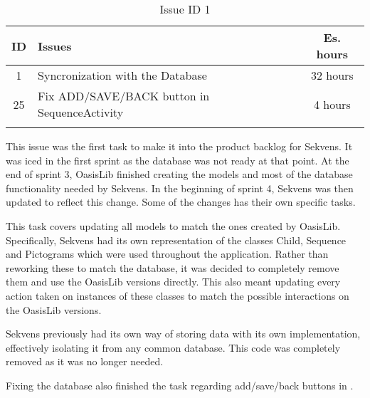 \begin{longtable} { | c | p{12cm} | c | } 
\hline
	ID 	&	Issues	&		 Es. hours \\\hline
	1	&	Syncronization with the Database	&	32 hours	\\\hline
	25	&	Fix ADD/SAVE/BACK button in SequenceActivity	&	4 hours	\\\hline
\caption{Issue ID 1}
\label{tab:spr4_syncwithdatabase}
\end{longtable}

This issue was the first task to make it into the product backlog for Sekvens. It was iced in the first sprint as the database was not ready at that point. At the end of sprint 3, OasisLib finished creating the models and most of the database functionality needed by Sekvens. In the beginning of sprint 4, Sekvens was then updated to reflect this change. Some of the changes has their own specific tasks.

This task covers updating all models to match the ones created by OasisLib. Specifically, Sekvens had its own representation of the classes Child, Sequence and Pictograms which were used throughout the application. Rather than reworking these to match the database, it was decided to completely remove them and use the OasisLib versions directly. This also meant updating every action taken on instances of these classes to match the possible interactions on the OasisLib versions.

Sekvens previously had its own way of storing data with its own implementation, effectively isolating it from any common database. This code was completely removed as it was no longer needed.

Fixing the database also finished the task regarding add/save/back buttons in .